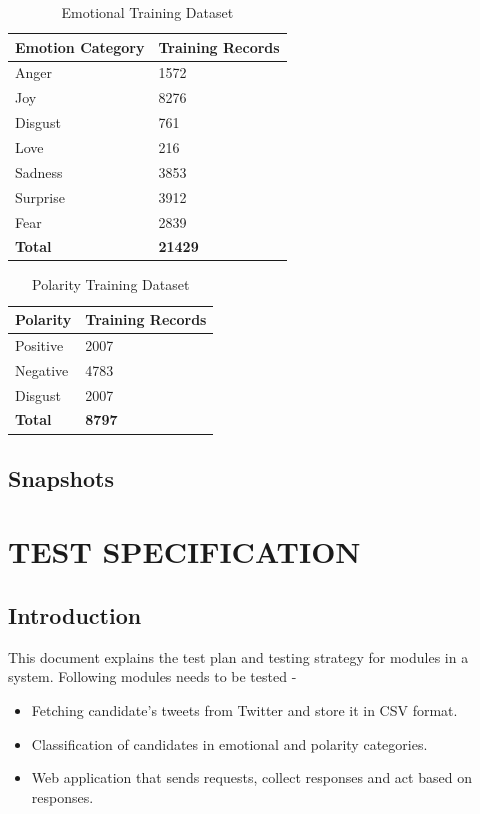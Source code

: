 \documentclass[oneside,a4paper,12pt]{pictreport}
\begin{document}
\renewcommand{\arraystretch}{1.5}
\begin{table}[h!]
\centering
\caption{Emotional Training Dataset}
\label{my-label}
\begin{tabular}{|l|l|}
\hline
\textbf{Emotion Category} & \textbf{Training Records} \\ \hline
Anger                     & 1572                      \\ \hline
Joy                       & 8276                      \\ \hline
Disgust                   & 761                       \\ \hline
Love                      & 216                       \\ \hline
Sadness                   & 3853                      \\ \hline
Surprise                  & 3912                      \\ \hline
Fear                      & 2839                      \\ \hline
\textbf{Total}            & \textbf{21429}            \\ \hline
\end{tabular}
\end{table}

\begin{table}[h!]
\centering
\caption{Polarity Training Dataset}
\label{my-label}
\begin{tabular}{|l|l|}
\hline
\textbf{Polarity} & \textbf{Training Records} \\ \hline
Positive          & 2007                      \\ \hline
Negative          & 4783                      \\ \hline
Disgust           & 2007                      \\ \hline
\textbf{Total}    & \textbf{8797}             \\ \hline
\end{tabular}
\end{table}


\section{Snapshots}

\chapter{TEST SPECIFICATION}

\section{Introduction}
This document explains the test plan and testing strategy for modules in a system. Following modules needs to be tested - 
\begin{itemize}
\item Fetching candidate's tweets from Twitter and store it in CSV format.
\item Classification of candidates in emotional and polarity categories.
\item Web application that sends requests, collect responses and act based on responses.
\end{itemize}
\end{document}

